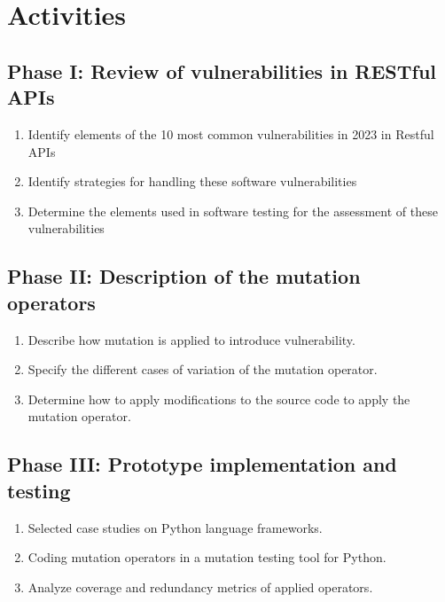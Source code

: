 \section{Activities}

\subsection{Phase I: Review of vulnerabilities in RESTful APIs}

\begin{enumerate}
    \item Identify elements of the 10 most common vulnerabilities in 2023 in Restful APIs
    \item Identify strategies for handling these software vulnerabilities
    \item Determine the elements used in software testing for the assessment of these vulnerabilities
\end{enumerate}

\subsection{Phase II: Description of the mutation operators}

\begin{enumerate}
    \item Describe how mutation is applied to introduce vulnerability.
    \item Specify the different cases of variation of the mutation operator.
    \item Determine how to apply modifications to the source code to apply the mutation operator.
\end{enumerate}

\subsection{Phase III: Prototype implementation and testing}

\begin{enumerate}
    \item Selected case studies on Python language frameworks.
    \item Coding mutation operators in a mutation testing tool for Python.
    \item Analyze coverage and redundancy metrics of applied operators.
\end{enumerate}